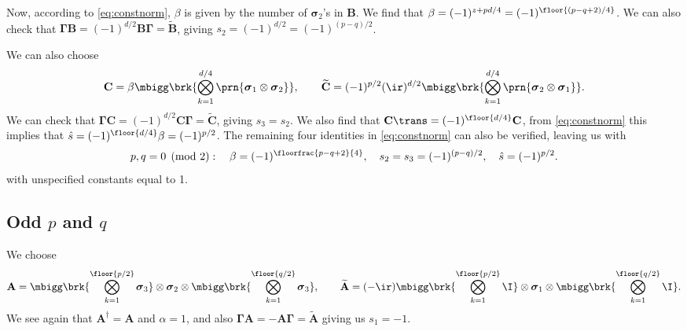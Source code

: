 \documentclass[11pt]{article}
\newcommand{\Gammab}{\boldsymbol{\Gamma}}
\newcommand{\A}{\mathbf{A}}
\newcommand{\B}{\mathbf{B}}
\renewcommand{\C}{\mathbf{C}}
\newcommand{\At}{\widetilde{\A}}
\newcommand{\Bt}{\widetilde{\B}}
\newcommand{\Ct}{\widetilde{\C}}
\newcommand{\sigmab}{\boldsymbol{\sigma}}
\begin{document}
Now, according to \cref{eq:constnorm}, $\beta$ is given by the number of $\sigmab_2$'s in $\B$.
We find that \( \beta = (-1)^{z + pd/4} = (-1)^{\floor{(p-q+2)/4}} \).
We can also check that $\Gammab \B = (-1)^{d/2}\B \Gammab = \Bt$, giving $s_2 = (-1)^{d/2} = (-1)^{(p-q)/2}$.

We can also choose
%
\begin{equation*}
  \C =  \beta \mbigg\brk{\bigotimes_{k=1}^{d/4} \prn{\sigmab_1 \otimes \sigmab_2}},
  \qquad
  \Ct = (-1)^{p/2} (\ir)^{d/2}
        \mbigg\brk{\bigotimes_{k=1}^{d/4} \prn{\sigmab_2 \otimes \sigmab_1}}.
\end{equation*}
%
We can check that $\Gammab \C = (-1)^{d/2}\C \Gammab = \Ct$, giving $s_3 = s_2$.
We also find that $\C\trans = (-1)^{\floor{d/4}} \C$, from \cref{eq:constnorm} this implies that
\( \hat{s} = (-1)^{\floor{d/4}} \beta = (-1)^{p/2} \).
The remaining four identities in \cref{eq:constnorm} can also be verified, leaving us with
%
\begin{equation}\label{eq:consteveneven}
  p, q = 0 \pmod 2 : \quad
  \beta = (-1)^{\floorfrac{p-q+2}{4}}, \quad
  s_2 = s_3 = (-1)^{(p-q)/2}, \quad
  \hat{s} = (-1)^{p/2}.
\end{equation}
%
with unspecified constants equal to 1.


\subsection{Odd \texorpdfstring{$p$ and $q$}{p and q}}\label{sec:oddodd}

We choose
%
\begin{equation*}
  \A =  \mbigg\brk{\bigotimes_{k=1}^{\floor{p/2}} \sigmab_3}
        \otimes \sigmab_2
        \otimes \mbigg\brk{\bigotimes_{k=1}^{\floor{q/2}} \sigmab_3},
  \qquad
  \At = (-\ir)
        \mbigg\brk{\bigotimes_{k=1}^{\floor{p/2}} \I}
        \otimes \sigmab_1
        \otimes \mbigg\brk{\bigotimes_{k=1}^{\floor{q/2}} \I}.
\end{equation*}
%
We see again that $\A^\dag = \A$ and $\alpha=1$, and also $\Gammab \A = - \A \Gammab =  \At$ giving us $s_1 = -1$.
\end{document}
